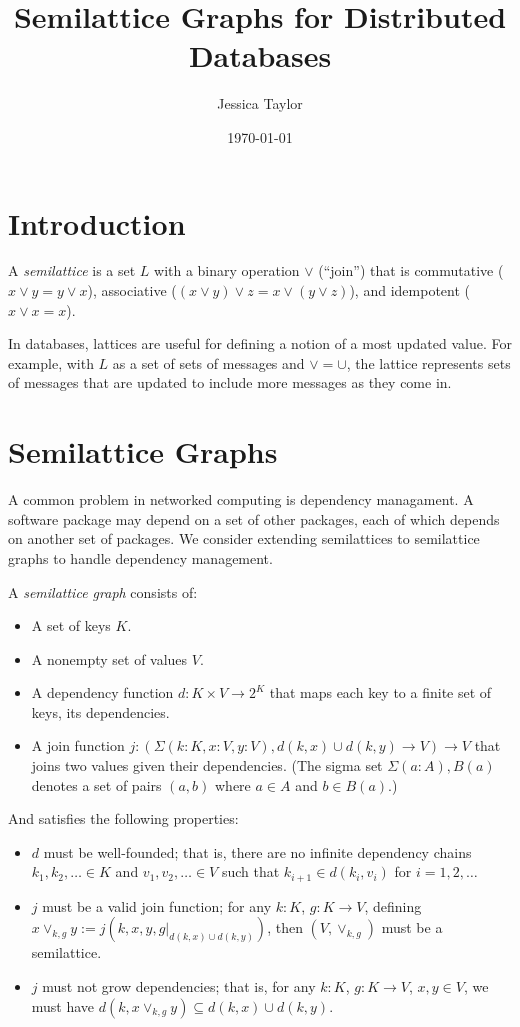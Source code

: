 \documentclass{article}
\title{Semilattice Graphs for Distributed Databases}
\author{Jessica Taylor}
\date{\today}
\begin{document}
    \maketitle
    
    \section{Introduction}
        A \emph{semilattice} is a set $L$ with a binary operation $\vee$ (``join'') that is commutative ($x \vee y = y \vee x$), associative ($(x \vee y) \vee z = x \vee (y \vee z)$), and idempotent ($x \vee x = x$).

        In databases, lattices are useful for defining a notion of a most updated value. For example, with $L$ as a set of sets of messages and $\vee = \cup$, the lattice represents sets of messages that are updated to include more messages as they come in.


    \section{Semilattice Graphs}

        A common problem in networked computing is dependency managament. A software package may depend on a set of other packages, each of which depends on another set of packages. We consider extending semilattices to semilattice graphs to handle dependency management.
        
        A \emph{semilattice graph} consists of:

        \begin{itemize}
            \item A set of keys $K$.
            \item A nonempty set of values $V$.
            \item A dependency function $d : K \times V \rightarrow 2^K$ that maps each key to a finite set of keys, its dependencies.
            \item A join function $j : (\Sigma (k: K, x : V, y : V), d(k, x) \cup d(k, y) \rightarrow V) \rightarrow V$ that joins two values given their dependencies. (The sigma set $\Sigma (a: A), B(a)$ denotes a set of pairs $(a, b)$ where $a \in A$ and $b \in B(a)$.)
        \end{itemize}

        And satisfies the following properties:

        \begin{itemize}
            \item $d$ must be well-founded; that is, there are no infinite dependency chains $k_1, k_2, \ldots \in K$ and $v_1, v_2, \ldots \in V$ such that $k_{i+1} \in d(k_i, v_i)$ for $i = 1, 2, \ldots$
            \item $j$ must be a valid join function; for any $k : K$, $g: K \rightarrow V$, defining $x \vee_{k,g} y := j(k, x, y, g|_{d(k, x) \cup d(k, y)})$, then $(V, \vee_{k,g})$ must be a semilattice.
            \item $j$ must not grow dependencies; that is, for any $k : K$, $g: K \rightarrow V$, $x, y \in V$, we must have $d(k, x \vee_{k, g} y) \subseteq d(k, x) \cup d(k, y)$.
        \end{itemize}
\end{document}
